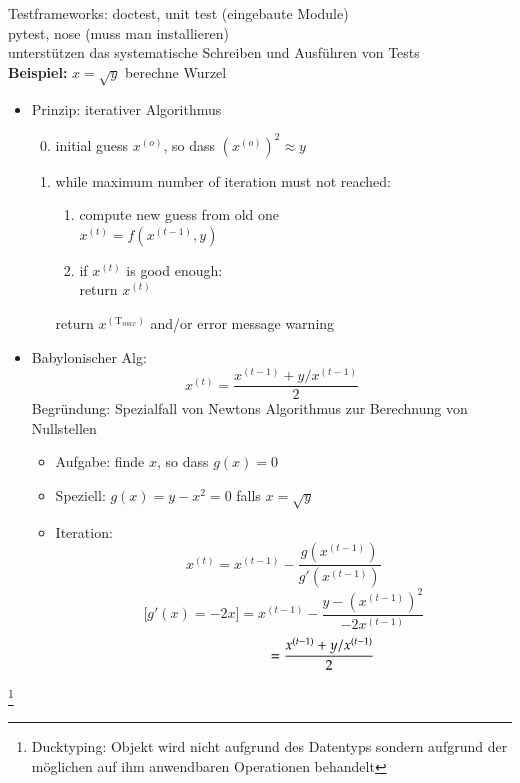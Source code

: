 \documentclass[11pt, fleqn]{scrreprt}
\begin{document}
Testframeworks: doctest, unit test (eingebaute Module) \\
\hspace*{2,85cm} pytest, nose (muss man installieren)\\
\hspace*{0,5cm} unterstützen das systematische Schreiben und Ausführen von Tests \\
\textbf{Beispiel: }$x=\sqrt{y}$ \hspace*{5mm}berechne Wurzel
\begin{itemize}
	\item Prinzip: iterativer Algorithmus
	\begin{enumerate}
		\setcounter{enumi}{-1}
		\item initial guess $x^{(o)}$, so dass $(x^{(o)})^{2} \approx y$
		\item while maximum number of iteration must not reached:
		\begin{enumerate}[label=\alph*)]
			\item compute new guess from old one \\
			$x^{(t)} = f(x^{(t-1)},y)$
			\item if $x^{(t)}$ is good enough: \\
			return $x^{(t)}$
		\end{enumerate}
		return $x^{(\text{T}_{max})}$ and/or error message warning
	\end{enumerate}
	\item Babylonischer Alg:
	 \[ x^{(t)} = \frac{x^{(t-1)}+y/x^{(t-1)}}{2} \]
	 Begründung: Spezialfall von Newtons Algorithmus zur Berechnung von Nullstellen
	 \begin{itemize}[label={}]
	 	\item Aufgabe: \hspace*{5mm}finde $x$, so dass $g(x) = 0$
	 	\item Speziell:  \hspace*{6mm}$g(x) = y - x^2 = 0$ falls $x = \sqrt{y}$
	 	\item Iteration: 
	 	\[ x^{(t)} = x^{(t-1)} - \frac{g(x^{(t-1)})}{g'(x^{(t-1)})}\]
	 	\[ \biggl\lbrack g'(x) = -2x \biggr\rbrack = x^{(t-1)} - \frac{y-{(x^{(t-1)})}^2}{-2x^{(t-1)}}\]
	 	\[ \hspace*{2cm} = \frac{x^{(t-1)} + y/x^{(t-1)}}{2}\]
	 \end{itemize}
\end{itemize}
\footnote{Ducktyping: Objekt wird nicht aufgrund des Datentyps sondern aufgrund der möglichen auf ihm anwendbaren Operationen behandelt}
\end{document}
